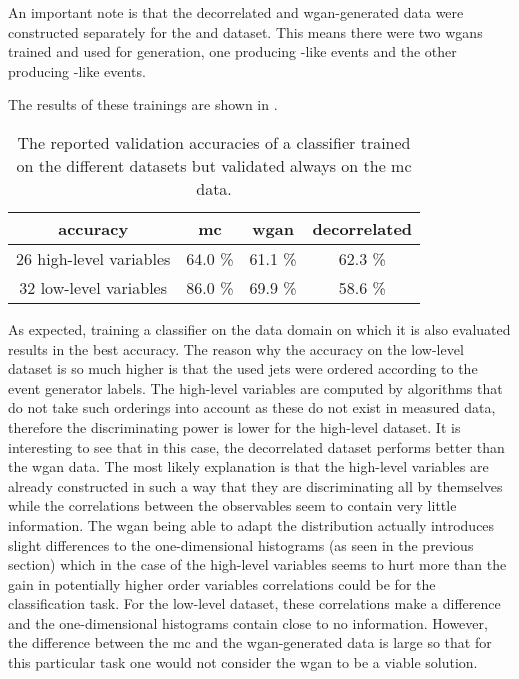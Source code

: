 An important note is that the decorrelated and \gls{wgan}-generated data were constructed separately for the \signal{} and \background{} dataset. This means there were two \glspl{wgan} trained and used for generation, one producing \signal{}-like events and the other producing \background{}-like events.

The results of these trainings are shown in .
\begin{table}
    \centering
    \begin{tabular}{cccc}
        accuracy & \gls{mc} & \gls{wgan} & decorrelated \\
        \midrule
        26 high-level variables & 64.0 \% & 61.1 \% & 62.3 \% \\
        32 low-level variables & 86.0 \% & 69.9 \% & 58.6 \%
    \end{tabular}
    \caption{The reported validation accuracies of a classifier trained on the different datasets but validated always on the \gls{mc} data.}\label{tab:classification-results}
\end{table}
As expected, training a classifier on the data domain on which it is also evaluated results in the best accuracy. The reason why the accuracy on the low-level dataset is so much higher is that the used jets were ordered according to the event generator labels. The high-level variables are computed by algorithms that do not take such orderings into account as these do not exist in measured data, therefore the discriminating power is lower for the high-level dataset. It is interesting to see that in this case, the decorrelated dataset performs better than the \gls{wgan} data. The most likely explanation is that the high-level variables are already constructed in such a way that they are discriminating all by themselves while the correlations between the observables seem to contain very little information. The \gls{wgan} being able to adapt the distribution actually introduces slight differences to the one-dimensional histograms (as seen in the previous section) which in the case of the high-level variables seems to hurt more than the gain in potentially higher order variables correlations could be for the classification task.
For the low-level dataset, these correlations make a difference and the one-dimensional histograms contain close to no information. However, the difference between the \gls{mc} and the \gls{wgan}-generated data is large so that for this particular task one would not consider the \gls{wgan} to be a viable solution.

